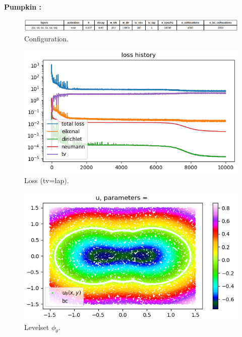 \documentclass[french]{article}
\begin{document}
	\textbf{Pumpkin :}
	
	\begin{figure}[H]
		\centering
		\includegraphics[width=\linewidth]{"levelset/pumpkin/config_pumpkin.png"}
		\caption{Configuration.}
	\end{figure}
	
	\begin{minipage}{0.33\linewidth}
		\begin{figure}[H]
			\centering
			\includegraphics[width=\linewidth]{"levelset/pumpkin/loss_pumpkin.png"}
			\caption{Loss (tv=lap).}
		\end{figure}
	\end{minipage}
	\begin{minipage}{0.33\linewidth}
		\begin{figure}[H]
			\centering
			\includegraphics[width=\linewidth]{"levelset/pumpkin/sol_pumpkin.png"}
			\caption{Levelset $\phi_\theta$.}
		\end{figure}
	\end{minipage}
\end{document}
